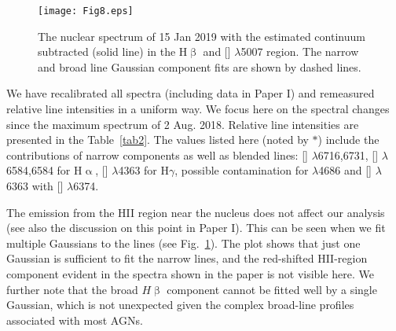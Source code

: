 \documentclass[fleqn,usenatbib]{mnras}
\begin{document}
\begin{figure}
	\texttt{[image: Fig8.eps]}
    \caption{The nuclear  spectrum of 15 Jan 2019 with the estimated continuum subtracted (solid line) in the H$\upbeta$ and [] $\lambda$5007 region.  The narrow and broad line Gaussian component fits are shown by dashed lines.}
    \label{fig8}
\end{figure}

We have recalibrated all spectra (including data in Paper I) and remeasured  relative line intensities in a uniform way. We focus here on the spectral changes since the maximum spectrum of 2 Aug. 2018. Relative line intensities are presented in the Table~\ref{tab2}. The values  listed here (noted by $*$) include the contributions of narrow components as well as blended lines: [] $\lambda$6716,6731, [] $\lambda$6584,6584 for H$\upalpha$, [] $\lambda$4363 for H$\gamma$, possible  contamination for  $\lambda$4686 and [] $\lambda$6363 with [] $\lambda$6374. 

The emission from the HII region near the nucleus \citep{Silva2017} does not affect our analysis (see also the discussion on this point in Paper I). This can be seen when we fit multiple Gaussians to the lines (see Fig.~\ref{fig8}). The plot shows that just one Gaussian is sufficient to fit the narrow lines, and the red-shifted HII-region component evident in the spectra shown in the  \citet{Silva2017} paper is not visible here. We further note that the broad $H{\upbeta}$ component cannot be fitted well by a single Gaussian, which is not unexpected given the complex broad-line profiles associated with most AGNs.
\end{document}
